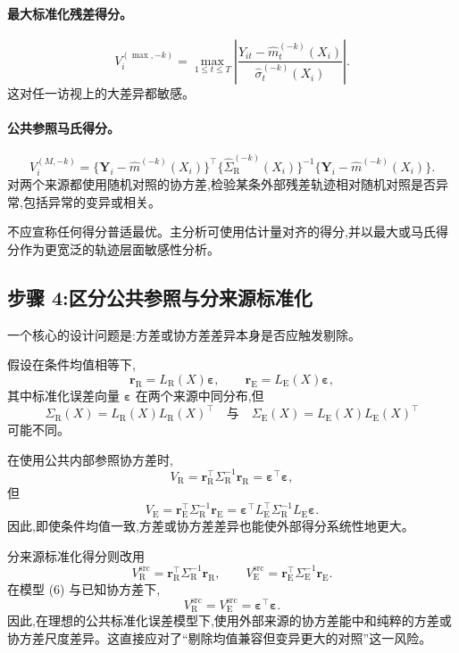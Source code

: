 \documentclass[11pt]{article}
\newcommand{\R}{\mathrm{R}}
\newcommand{\E}{\mathrm{E}}
\begin{document}
\paragraph{最大标准化残差得分。}
\[
V_i^{(\max,-k)}
=
\max_{1\le t\le T}
\left|
\frac{Y_{it}-\widehat m_t^{(-k)}(X_i)}
{\widehat\sigma_t^{(-k)}(X_i)}
\right|.
\tag{4}
\]
这对任一访视上的大差异都敏感。

\paragraph{公共参照马氏得分。}
\[
V_i^{(M,-k)}
=
\{\bm Y_i-\widehat m^{(-k)}(X_i)\}^{\top}
\{\widehat\Sigma_{\R}^{(-k)}(X_i)\}^{-1}
\{\bm Y_i-\widehat m^{(-k)}(X_i)\}.
\tag{5}
\]
对两个来源都使用随机对照的协方差,检验某条外部残差轨迹相对随机对照是否异常,包括异常的变异或相关。

不应宣称任何得分普适最优。主分析可使用估计量对齐的得分,并以最大或马氏得分作为更宽泛的轨迹层面敏感性分析。

\subsection{步骤 4:区分公共参照与分来源标准化}

一个核心的设计问题是:方差或协方差差异本身是否应触发剔除。

假设在条件均值相等下,
\[
\bm r_{\R}=L_{\R}(X)\bm\varepsilon,
\qquad
\bm r_{\E}=L_{\E}(X)\bm\varepsilon,
\tag{6}
\]
其中标准化误差向量 $\bm\varepsilon$ 在两个来源中同分布,但
\[
\Sigma_{\R}(X)=L_{\R}(X)L_{\R}(X)^{\top}
\quad\text{与}\quad
\Sigma_{\E}(X)=L_{\E}(X)L_{\E}(X)^{\top}
\]
可能不同。

在使用公共内部参照协方差时,
\[
V_{\R}=\bm r_{\R}^{\top}\Sigma_{\R}^{-1}\bm r_{\R}
=\bm\varepsilon^{\top}\bm\varepsilon,
\]
但
\[
V_{\E}=\bm r_{\E}^{\top}\Sigma_{\R}^{-1}\bm r_{\E}
=\bm\varepsilon^{\top}L_{\E}^{\top}\Sigma_{\R}^{-1}L_{\E}\bm\varepsilon.
\]
因此,即使条件均值一致,方差或协方差差异也能使外部得分系统性地更大。

分来源标准化得分则改用
\[
V_{\R}^{\mathrm{src}}
=\bm r_{\R}^{\top}\Sigma_{\R}^{-1}\bm r_{\R},
\qquad
V_{\E}^{\mathrm{src}}
=\bm r_{\E}^{\top}\Sigma_{\E}^{-1}\bm r_{\E}.
\tag{7}
\]
在模型 (6) 与已知协方差下,
\[
V_{\R}^{\mathrm{src}}=V_{\E}^{\mathrm{src}}=\bm\varepsilon^{\top}\bm\varepsilon.
\]
因此,在理想的公共标准化误差模型下,使用外部来源的协方差能中和纯粹的方差或协方差尺度差异。这直接应对了``剔除均值兼容但变异更大的对照''这一风险。
\end{document}
